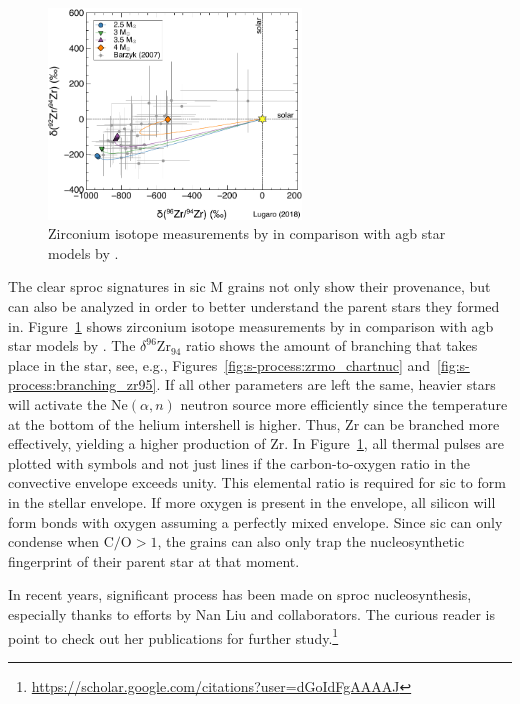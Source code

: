 \begin{figure}[tb]
    \centering
    \includegraphics[width=0.6\textwidth]{graphics/stardust/zr_s-proc}
    \caption{Zirconium isotope measurements by \citet{barzyk07} in comparison with \ac{agb} star models by \citet{lugaro18}.}
    \label{fig:stardust:zr_comparison_barzyk_lugaro}
\end{figure}
The clear \ac{sproc} signatures in \ac{sic} M grains not only show their provenance, but can also be analyzed in order to better understand the parent stars they formed in.
Figure~\ref{fig:stardust:zr_comparison_barzyk_lugaro} shows zirconium isotope measurements by \citet{barzyk07} in comparison with \ac{agb} star models by \citet{lugaro18}. The $\delta^{96}\mathrm{Zr}_{94}$ ratio shows the amount of branching that takes place in the star, see, e.g., Figures~\ref{fig:s-process:zrmo_chartnuc} and~\ref{fig:s-process:branching_zr95}. If all other parameters are left the same, heavier stars will activate the Ne$(\alpha,n)$ neutron source more efficiently since the temperature at the bottom of the helium intershell is higher. Thus, Zr can be branched more effectively, yielding a higher production of Zr. In Figure~\ref{fig:stardust:zr_comparison_barzyk_lugaro}, all thermal pulses are plotted with symbols and not just lines if the carbon-to-oxygen ratio in the convective envelope exceeds unity. This elemental ratio is required for \ac{sic} to form in the stellar envelope. If more oxygen is present in the envelope, all silicon will form bonds with oxygen assuming a perfectly mixed envelope. Since \ac{sic} can only condense when $\mathrm{C}/\mathrm{O}>1$, the grains can also only trap the nucleosynthetic fingerprint of their parent star at that moment. 

In recent years, significant process has been made on \ac{sproc} nucleosynthesis, especially thanks to efforts by Nan Liu and collaborators. The curious reader is point to check out her publications for further study.\footnote{\url{https://scholar.google.com/citations?user=dGoIdFgAAAAJ}}



